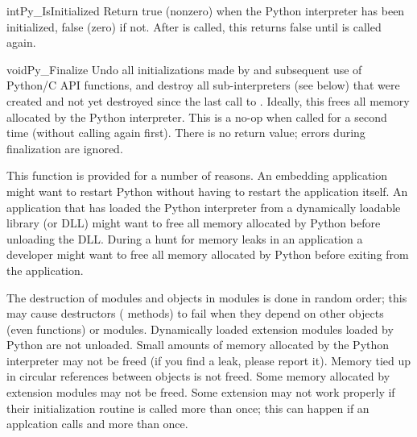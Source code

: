 \documentclass{manual}
\begin{document}
\begin{cfuncdesc}{int}{Py_IsInitialized}{}
Return true (nonzero) when the Python interpreter has been
initialized, false (zero) if not.  After  is
called, this returns false until  is called
again.
\end{cfuncdesc}

\begin{cfuncdesc}{void}{Py_Finalize}{}
Undo all initializations made by  and
subsequent use of Python/C API functions, and destroy all
sub-interpreters (see  below) that were
created and not yet destroyed since the last call to
.  Ideally, this frees all memory allocated
by the Python interpreter.  This is a no-op when called for a second
time (without calling  again first).  There
is no return value; errors during finalization are ignored.

This function is provided for a number of reasons.  An embedding 
application might want to restart Python without having to restart the 
application itself.  An application that has loaded the Python 
interpreter from a dynamically loadable library (or DLL) might want to 
free all memory allocated by Python before unloading the DLL. During a 
hunt for memory leaks in an application a developer might want to free 
all memory allocated by Python before exiting from the application.

 The destruction of modules and objects in 
modules is done in random order; this may cause destructors 
( methods) to fail when they depend on other objects 
(even functions) or modules.  Dynamically loaded extension modules 
loaded by Python are not unloaded.  Small amounts of memory allocated 
by the Python interpreter may not be freed (if you find a leak, please 
report it).  Memory tied up in circular references between objects is 
not freed.  Some memory allocated by extension modules may not be 
freed.  Some extension may not work properly if their initialization 
routine is called more than once; this can happen if an applcation 
calls  and  more
than once.
\end{cfuncdesc}
\end{document}

